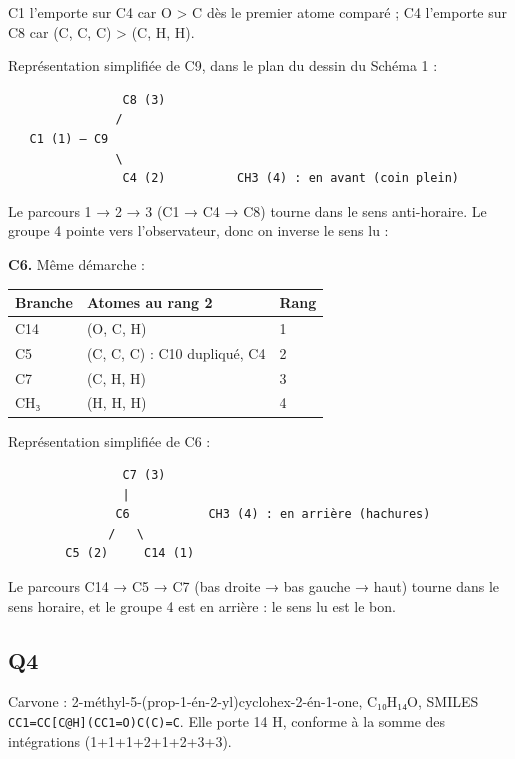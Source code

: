 \documentclass[11pt,a4paper]{article}
\newcommand{\equationajustee}[1]{%
  \sbox{\boiteequation}{$\displaystyle #1$}%
  \ifdim\wd\boiteequation>\linewidth
    \[\resizebox{\linewidth}{!}{\usebox{\boiteequation}}\]%
  \else
    \[#1\]%
  \fi}
\begin{document}
C1 l'emporte sur C4 car O \textgreater{} C dès le premier atome comparé ; C4 l'emporte sur C8 car (C, C, C) \textgreater{} (C, H, H).

Représentation simplifiée de C9, dans le plan du dessin du Schéma 1 :

\begin{lstlisting}
                C8 (3)
               /
   C1 (1) — C9
               \
                C4 (2)          CH3 (4) : en avant (coin plein)
\end{lstlisting}

Le parcours 1 → 2 → 3 (C1 → C4 → C8) tourne dans le sens anti-horaire. Le groupe 4 pointe vers l'observateur, donc on inverse le sens lu :

\equationajustee{\boxed{\text{C9 : } R}}

\textbf{C6.} Même démarche :

\begin{longtable}[]{@{}lll@{}}
\toprule\noalign{}
Branche & Atomes au rang 2 & Rang \\
\midrule\noalign{}
\endhead
\bottomrule\noalign{}
\endlastfoot
C14 & (O, C, H) & 1 \\
C5 & (C, C, C) : C10 dupliqué, C4 & 2 \\
C7 & (C, H, H) & 3 \\
CH₃ & (H, H, H) & 4 \\
\end{longtable}

Représentation simplifiée de C6 :

\begin{lstlisting}
                C7 (3)
                |
               C6           CH3 (4) : en arrière (hachures)
              /   \
        C5 (2)     C14 (1)
\end{lstlisting}

Le parcours C14 → C5 → C7 (bas droite → bas gauche → haut) tourne dans le sens horaire, et le groupe 4 est en arrière : le sens lu est le bon.

\equationajustee{\boxed{\text{C6 : } R}}

\hypertarget{q4}{%
\subsection{Q4}\label{q4}}

Carvone : 2-\allowbreak{}méthyl-\allowbreak{}5-\allowbreak{}(prop-\allowbreak{}1-\allowbreak{}én-\allowbreak{}2-\allowbreak{}yl)cyclohex-\allowbreak{}2-\allowbreak{}én-\allowbreak{}1-\allowbreak{}one, C₁₀H₁₄O, SMILES \texttt{CC1=\allowbreak{}CC{[}C@H{]}\allowbreak{}(\allowbreak{}CC1=\allowbreak{}O)\allowbreak{}C(\allowbreak{}C)\allowbreak{}=\allowbreak{}C}. Elle porte 14 H, conforme à la somme des intégrations (1+1+1+2+1+2+3+3).
\end{document}
